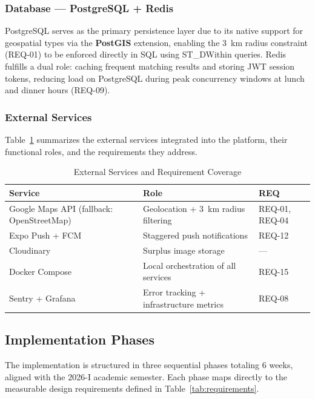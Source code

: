 \documentclass[conference]{IEEEtran}
\begin{document}
\subsubsection{Database — PostgreSQL + Redis}

PostgreSQL serves as the primary persistence layer due to its native support for geospatial types via the \textbf{PostGIS} extension, enabling the 3~km radius constraint (REQ-01) to be enforced directly in SQL using ST\_DWithin queries. Redis fulfills a dual role: caching frequent matching results and storing JWT session tokens, reducing load on PostgreSQL during peak concurrency windows at lunch and dinner hours (REQ-09).

\subsubsection{External Services}

Table~\ref{tab:tech_stack} summarizes the external services integrated into the platform, their functional roles, and the requirements they address.

\begin{table}[h]
\centering
\footnotesize
\caption{External Services and Requirement Coverage}
\label{tab:tech_stack}
\begin{tabular}{p{2.8cm} p{2.8cm} p{1.8cm}}
\toprule
\textbf{Service} & \textbf{Role} & \textbf{REQ} \\
\midrule
Google Maps API (fallback: OpenStreetMap) & Geolocation + 3~km radius filtering & REQ-01, REQ-04 \\[4pt]
Expo Push + FCM & Staggered push notifications & REQ-12 \\[4pt]
Cloudinary & Surplus image storage & --- \\[4pt]
Docker Compose & Local orchestration of all services & REQ-15 \\[4pt]
Sentry + Grafana & Error tracking + infrastructure metrics & REQ-08 \\
\bottomrule
\end{tabular}
\end{table}

\subsection{Implementation Phases}

The implementation is structured in three sequential phases totaling 6 weeks, aligned with the 2026-I academic semester. Each phase maps directly to the measurable design requirements defined in Table~\ref{tab:requirements}.
\end{document}
